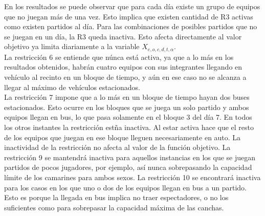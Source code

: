 \indent En los resultados se puede observar que para cada día existe un grupo de equipos que no juegan más de una vez. Esto implica que existen cantidad de R3 activas como existen partidos al día. Para las combinaciones de posibles partidos que no se juegan en un día, la R3 queda inactiva. Esto afecta directamente al valor objetivo ya limita diariamente a la variable $X_{e,o,c,d,t,\alpha}$.\\
\indent La restricción 6 se entiende que núnca está activa, ya que a lo más en los resultados obtenidos, habrán cuatro equipos con sus integrantes llegando en vehículo al recinto en un bloque de tiempo, y aún en ese caso no se alcanza a llegar al máximo de vehículos estacionados.\\
\indent La restricción 7 impone que a lo más en un bloque de tiempo hayan dos buses estacionados. Esto ocurre en los bloques que se juega un solo partido y ambos equipos llegan en bus, lo que  pasa solamente en el bloque 3 del día 7. En todos los otros instantes la restricción estña inactiva. Al estar activa hace que el resto de los equipos que juegan en ese bloque lleguen necesariamente en auto. La inactividad de la restricción no afecta al valor de la función objetivo. 
\indent La restricción 9 se mantendrá inactiva para aquellos instancias en los que se juegan partidos de pocos jugadores, por ejemplo, así nunca sobrepasando la capacidad límite de los camarines para ambos sexos.
\indent La restricción 10 se encontrará inactiva para los casos en los que uno o dos de los equipos llegan en bus a un partido. Esto es porque la llegada en bus implica no traer espectadores, o no los suficientes como para sobrepasar la capacidad máxima de las canchas.